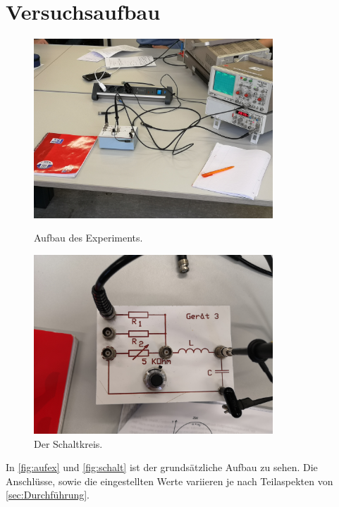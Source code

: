 
\section{Versuchsaufbau}
\label{sec:Versuchsaufbau}

\begin{figure}
    \centering
    \includegraphics[width=0.8\textwidth]{content/Aufbau.jpg}
    \caption{Aufbau des Experiments.}
    \label{fig:aufex}

    \includegraphics[width=0.8\textwidth]{content/Schaltkreis.jpg}
    \caption{Der Schaltkreis.}
    \label{fig:schalt}
\end{figure}
In \autoref{fig:aufex} und \autoref{fig:schalt} ist der grundsätzliche Aufbau zu sehen. 
Die Anschlüsse, sowie die eingestellten Werte variieren je nach Teilaspekten von \autoref{sec:Durchführung}.
